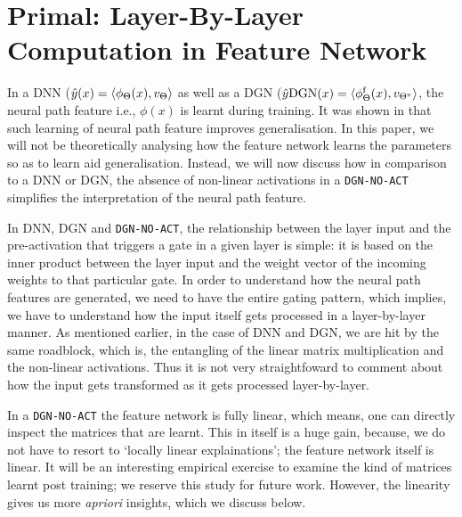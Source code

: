 \section{Primal: Layer-By-Layer Computation in Feature Network}\label{sec:primal}
In a DNN ($\hat{y}(x)=\langle \phi_\Theta(x),v_{\Theta}\rangle$ as well as a DGN ($\hat{y}{\text{DGN}}(x)=\langle \phi_\Theta^{\textrm{f}}(x),v_{{\Theta}^{\text{v}}}\rangle$, the neural path feature i.e., $\phi(x)$ is learnt during training. It was shown in \citep{npk} that such learning of neural path feature improves generalisation. In this paper, we will not be theoretically analysing how the feature network learns the parameters so as to learn aid generalisation. Instead, we will now discuss how in comparison to a DNN or DGN, the absence of non-linear activations in a \texttt{DGN-NO-ACT} simplifies the interpretation of the neural path feature. 

In DNN, DGN and \texttt{DGN-NO-ACT}, the relationship between the layer input and the pre-activation that triggers a gate in a given layer is simple: it is based on the inner product between the layer input and the weight vector of the incoming weights to that particular gate. In order to understand how the neural path features are generated, we need to have the entire gating pattern, which implies, we have to understand how the input itself gets processed in a layer-by-layer manner. As mentioned earlier, in the case of DNN and DGN, we are hit by the same roadblock, which is, the entangling of the linear matrix multiplication and the non-linear activations. Thus it is not very straightfoward to comment about how the input gets transformed as it gets processed layer-by-layer. 


In a \texttt{DGN-NO-ACT} the feature network is fully linear, which means, one can directly inspect the matrices that are learnt. This in itself is a huge gain, because, we do not have to resort to  `locally linear explainations'; the feature network itself is linear. It will be an interesting empirical exercise to examine the kind of matrices learnt post training; we reserve this study for future work. However, the linearity gives us more \emph{apriori} insights, which we discuss below. 

